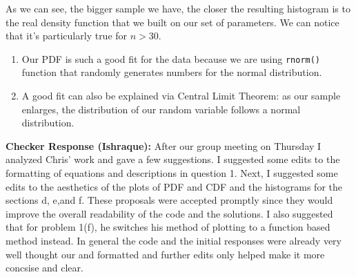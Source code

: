 \documentclass{article}\usepackage[]{graphicx}\usepackage[]{color}
\begin{document}
\begin{enumerate}
\begin{enumerate}
As we can see, the bigger sample we have, the closer the resulting histogram is to the real density function that we built on our set of parameters. We can notice that it's particularly true for $n>30$.\\
\begin{enumerate}
  \item Our PDF is such a good fit for the data because we are using \texttt{rnorm()} function that randomly generates numbers for the normal distribution. 
  \item A good fit can also be explained via Central Limit Theorem: as our sample enlarges, the distribution of our random variable follows a normal distribution.
\end{enumerate}

\textbf{Checker Response (Ishraque):} After our group meeting on Thursday I analyzed Chris' work and gave a few suggestions. I suggested some edits to the formatting of equations and descriptions in question 1. Next, I suggested some edits to the aesthetics of the plots of PDF and CDF and the histograms for the sections d, e,and f. These proposals were accepted promptly since they would improve the overall readability of the code and the solutions. I also suggested that for problem 1(f), he switches his method of plotting to a function based  method instead. In general the code and the initial responses were already very well thought our and formatted and further edits only helped make it more concsise and clear.


\end{enumerate}
\end{enumerate}
\end{document}
